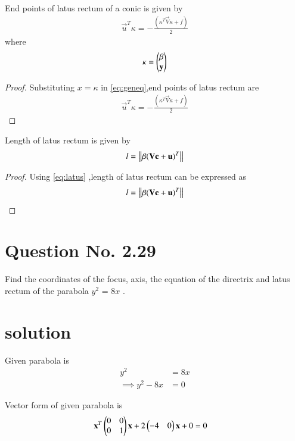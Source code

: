 \documentclass[journal,12pt,twocolumn]{IEEEtran}
\begin{document}
\begin{lemma}
End points of latus rectum of a conic is given by
\begin{align}
\vec{u}^T\kappa = -\frac{(\kappa^T\vec{V}\kappa + f )}{2} \label{eq:endpt}
\end{align}
where
\begin{align}
\kappa = \begin{pmatrix}\beta \\ \mathbf{y}\end{pmatrix}
\end{align}
\end{lemma}

\begin{proof}
Substituting $x=\kappa$ in \eqref{eq:geneq},end points of latus rectum are
\begin{align}
\vec{u}^T\kappa = -\frac{(\kappa^T\vec{V}\kappa + f )}{2}
\end{align}
\end{proof}

\begin{lemma}
Length of latus rectum is given by 
\begin{align}
l=\left\lVert\beta(\mathbf{V}\mathbf{c}+\mathbf{u})^T\right\rVert \label{eq:length}
\end{align}
\end{lemma}

\begin{proof}
Using \eqref{eq:latus} ,length of latus rectum can be expressed as
\begin{align}
  l=\left\lVert\beta(\mathbf{V}\mathbf{c}+\mathbf{u})^T\right\rVert
\end{align}
\end{proof}

\clearpage
\section{Question No. 2.29}
Find the coordinates of the focus, axis, the equation of the directrix and latus rectum of the parabola $y^2$ = 8$x$ .
%
\section{solution}
Given parabola is 
\begin{align}
y^2 &= 8x
\\
\implies y^2 - 8x &= 0
\end{align}

Vector form of given parabola is
\begin{align}
\mathbf{x}^T\begin{pmatrix}0 & 0 \\ 0 & 1\end{pmatrix}\mathbf{x} + 2\begin{pmatrix}-4 & 0\end{pmatrix}\mathbf{x} + 0 &= 0 
\end{align}
\end{document}
